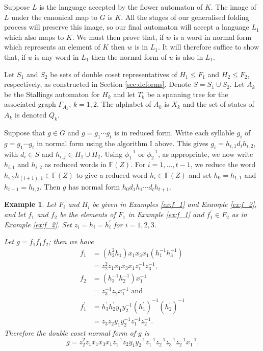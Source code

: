 \documentclass[a4paper,12pt]{article}
\newcommand{\G}{\Gamma }
\newtheorem{exam}[theorem]{Example}
\newenvironment{example}{\begin{exam} \rm}{\end{exam}}
\numberwithin{equation}{section}
\numberwithin{figure}{section}
\newcommand{\FF}{\ensuremath{\mathbb{F}}}
\begin{document}
 Suppose $L$ is the
language accepted by the flower automaton of $K$. The image of $L$ under
the canonical map to $G$ is $K$. All the stages of our generalised folding
process will preserve this image, so our final automaton will accept a language
$L_1$ which also maps to $K$. We must then prove that, if $w$ is a word
in normal form which represents an element of $K$ then $w$ is in $L_1$. It will
therefore suffice to show that, if $u$ is any word in $L_1$ then the
normal form of $u$ is also in $L_1$.

Let $S_1$ and $S_2$ be sets of double coset representatives of
$H_1\le F_1$ and $H_2\le F_2$, respectively, as constructed in Section
\ref{sec:dcforms}.
Denote $S= S_1 \cup S_2$. Let $A_k$ be the
Stallings automaton for $H_k$ and let $T_k$ be a spanning tree for
the associated graph $\G_{A_k}$, $k=1,2$. The alphabet of $A_k$ is
$X_k$ and the set of states of $A_k$ is denoted $Q_k$.

Suppose that $g \in G$ and $g=g_1\cdots g_t$ is in reduced form.
Write each syllable $g_i$ of $g=g_1\cdots g_t$ in normal form
using the algorithm I above. This gives
$g_i=h_{i,1}d_ih_{i,2}$, with $d_i\in S$ and $h_{i,j}\in H_1\cup
H_2$. Using $\phi_1^{-1}$ or $\phi_2^{-1}$, as appropriate, we now
write $h_{i,1}$ and $h_{i,2}$ as reduced words in $\FF(Z)$. For
$i=1,\ldots , t-1$, we reduce the word $h_{i,2}h_{(i+1),1}\in
\FF(Z)$ to give a reduced word $h_i\in \FF(Z)$ and set $h_0=h_{1,1}$
and  $h_{t+1}=h_{t,2}$. Then $g$ has normal form $h_0d_1h_1\cdots
d_th_{t+1}$.


\begin{example}\label{ex:g}
Let $F_i$ and $H_i$ be given in Examples \ref{ex:f_1} and
Example \ref{ex:f_2}, and
let $f_1$ and $f_2$ be the elements of $F_1$ in Example \ref{ex:f_1} and
$f_1^\prime\in F_2$ as in Example \ref{ex:f_2}.
Set $z_i = h_i = h_i^{\prime}$ for $i= 1,2,3$.

Let $g =f_1 f_1^\prime f_2$; then we have
\begin{align*}
f_1&=(h_2^{2}h_1) x_1x_3x_1 (h_1^{-1}h_3^{-1})\\
&=z_2^2z_1  x_1x_3x_1z_1^{-1}z_3^{-1},\\
f_2&=(h_3^{-1}h_2^{-1}) x_1^{-1}\\
&=z_3^{-1}z_2 x_1^{-1}\textrm{ and }\\
f_1^\prime&=h^\prime_3h_2^\prime y_1y_2^{-1} (h_1^\prime)^{-1}(h_2^\prime)^{-1}\\
&= z_3z_2 y_1y_2^{-1} z_1^{-1}z_2^{-1}.
\end{align*}
Therefore the double coset normal form of $g$ is
\[g=z_2^2 z_1  x_1 x_3 x_1 z_1^{-1}
z_2y_1y_2^{-1} z_1^{-1}z_2^{-1}
z_3^{-1}z_2^{-1} x_1^{-1}.
\]
\end{example}
\end{document}
